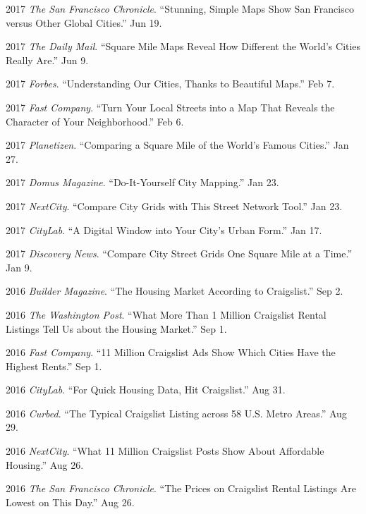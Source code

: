 \documentclass{academiccv}
\begin{document}
\begin{tablist}
	
\item 2017 \tab \emph{The San Francisco Chronicle}. \enquote{Stunning, Simple Maps Show San Francisco versus Other Global Cities.} Jun 19.

\item 2017 \tab \emph{The Daily Mail}. \enquote{Square Mile Maps Reveal How Different the World's Cities Really Are.} Jun 9.

\item 2017 \tab \emph{Forbes}. \enquote{Understanding Our Cities, Thanks to Beautiful Maps.} Feb 7.

\item 2017 \tab \emph{Fast Company}. \enquote{Turn Your Local Streets into a Map That Reveals the Character of Your Neighborhood.} Feb 6.

\item 2017 \tab \emph{Planetizen}. \enquote{Comparing a Square Mile of the World's Famous Cities.} Jan 27.

\item 2017 \tab \emph{Domus Magazine}. \enquote{Do-It-Yourself City Mapping.} Jan 23.

\item 2017 \tab \emph{NextCity}. \enquote{Compare City Grids with This Street Network Tool.} Jan 23.

\item 2017 \tab \emph{CityLab}. \enquote{A Digital Window into Your City's Urban Form.} Jan 17.

\item 2017 \tab \emph{Discovery News}. \enquote{Compare City Street Grids One Square Mile at a Time.} Jan 9.

\item 2016 \tab \emph{Builder Magazine}. \enquote{The Housing Market According to Craigslist.} Sep 2.

\item 2016 \tab \emph{The Washington Post}. \enquote{What More Than 1 Million Craigslist Rental Listings Tell Us about the Housing Market.} Sep 1.

\item 2016 \tab \emph{Fast Company}. \enquote{11 Million Craigslist Ads Show Which Cities Have the Highest Rents.} Sep 1.

\item 2016 \tab \emph{CityLab}. \enquote{For Quick Housing Data, Hit Craigslist.} Aug 31.

\item 2016 \tab \emph{Curbed}. \enquote{The Typical Craigslist Listing across 58 U.S. Metro Areas.} Aug 29.

\item 2016 \tab \emph{NextCity}. \enquote{What 11 Million Craigslist Posts Show About Affordable Housing.} Aug 26.

\item 2016 \tab \emph{The San Francisco Chronicle}. \enquote{The Prices on Craigslist Rental Listings Are Lowest on This Day.} Aug 26.

\end{tablist}
\end{document}
